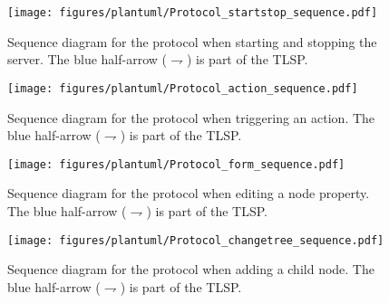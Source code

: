 

\newcommand{\bluearrowDesc}{The blue half-arrow ($\rightharpoondown$) is part of the \acrfull{TLSP}.}

\begin{figure}[htbp]  %
  \centering
  \texttt{[image: figures/plantuml/Protocol\_startstop\_sequence.pdf]}
  \caption[Protocol Sequence Diagram of Start/Stop]{Sequence diagram for the protocol when starting and stopping the server. \bluearrowDesc}\label{fig:protocol-startstop}
\end{figure}

\begin{figure}[htbp]  %
  \centering
  \texttt{[image: figures/plantuml/Protocol\_action\_sequence.pdf]}
  \caption[Protocol Sequence Diagram of Action Triggering]{Sequence diagram for the protocol when triggering an action. \bluearrowDesc}\label{fig:protocol-action}
\end{figure}

\begin{figure}[htbp]  %
  \centering
  \texttt{[image: figures/plantuml/Protocol\_form\_sequence.pdf]}
  \caption[Protocol Sequence Diagram of Property Form]{Sequence diagram for the protocol when editing a node property. \bluearrowDesc}\label{fig:protocol-form}
\end{figure}

\begin{figure}[htbp]  %
  \centering
  \texttt{[image: figures/plantuml/Protocol\_changetree\_sequence.pdf]}
  \caption[Protocol Sequence Diagram of Tree Changes]{Sequence diagram for the protocol when adding a child node. \bluearrowDesc}\label{fig:protocol-changetree}
\end{figure}

\FloatBarrier
